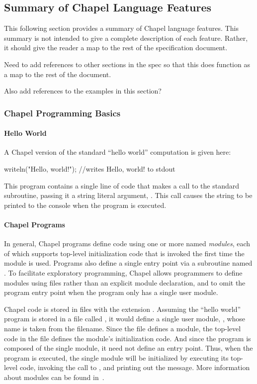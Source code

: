 \subsection{Summary of Chapel Language Features}

This following section provides a summary of Chapel language features.  
This summary is not intended to give a complete description of each feature.
Rather, it should give the reader a map to the rest of the specification
document.  

\begin{TODO}
Need to add references to other sections in the spec so that this does
function as a map to the rest of the document.

Also add references to the examples in this section?
\end{TODO}

\subsubsection{Chapel Programming Basics}
\paragraph{Hello World} 
A Chapel version of the standard ``hello world'' computation is given
here:
\begin{chapel}
writeln("Hello, world!"); //writes Hello, world! to stdout
\end{chapel}
\noindent This program contains a single line of code that makes a
call to the standard  subroutine, passing it a string
literal argument, .  This call causes the string
to be printed to the console when the program is executed.

\paragraph{Chapel Programs}
In general, Chapel programs define code using one or more named
\emph{modules}, each of which supports top-level initialization code
that is invoked the first time the module is used.  Programs also
define a single entry point via a subroutine named .  To
facilitate exploratory programming, Chapel allows programmers to
define modules using files rather than an explicit module declaration,
and to omit the program entry point when the program only has a single
user module.  

Chapel code is stored in files with the extension .
Assuming the ``hello world'' program is stored in a file called 
, it
would define a single user module, , whose name is taken
from the filename.  Since the file defines a module, the top-level
code in the file defines the module's initialization code.  And since
the program is composed of the single  module, it need not
define an entry point.  Thus, when the program is executed, the single
 module will be initialized by executing its top-level
code, invoking the call to , and printing out the
message.  More information about modules can be found in~. 

